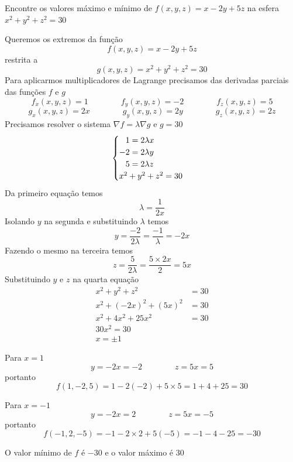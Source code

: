 \documentclass[a4paper,12pt,fleqn]{article}
\begin{document}
Encontre os valores máximo e mínimo de \(f(x, y, z) = x - 2y + 5z\)
na esfera \(x^2+y^2+z^2=30\)

\begin{answer}
  Queremos os extremos da função
  \[
    f(x, y, z) = x - 2y + 5z
  \]
  restrita a
  \[
    g(x, y, z) = x^2 + y^2 + z^2 = 30
  \]
  Para aplicarmos multiplicadores de Lagrange precisamos das derivadas parciais
  das funções $f$ e $g$
  \[
    f_x(x, y, z) =  1 \qquad\qquad
    f_y(x, y, z) = -2 \qquad\qquad
    f_z(x, y, z) =  5
  \]
  \[
    g_x(x, y, z) = 2x \qquad\qquad
    g_y(x, y, z) = 2y \qquad\qquad
    g_z(x, y, z) = 2z
  \]
  Precisamos resolver o sistema \(\nabla f = \lambda \nabla g\) e \(g=30\)
  \[
  \begin{cases}
    \hphantom{-}1 = 2\lambda x \\
    -2 = 2\lambda y \\
    \hphantom{-}5 = 2\lambda z \\
    x^2 + y^2 + z^2 = 30
  \end{cases}
  \]
  Da primeiro equação temos
  \[
    \lambda = \frac{1}{2x}
  \]
  Isolando $y$ na segunda e substituindo $\lambda$ temos
  \[
    y
    = \frac{-2}{2\lambda}
    = \frac{-1}{\lambda}
    = -2x
  \]
  Fazendo o mesmo na terceira temos
  \[
    z
    = \frac{5}{2\lambda}
    = \frac{5\times 2x}{2}
    = 5x
  \]
  Substituindo $y$ e $z$ na quarta equação
  \begin{align*}
    x^2 + y^2 + z^2        & = 30 \\
    x^2 + (-2x)^2 + (5x)^2 & = 30 \\
    x^2 + 4x^2 + 25x^2     & = 30 \\
    30 x^2 = 30            &  \\
    x = \pm 1              &
  \end{align*}

  Para $x=1$
  \[
    y = -2x = -2 \qquad\qquad
    z = 5x = 5
  \]
  portanto
  \[
    f(1, -2, 5)
    = 1 - 2(-2) + 5\times 5
    = 1 + 4 + 25
    = 30
  \]

  Para $x=-1$
  \[
    y = -2x = 2 \qquad\qquad
    z = 5x = -5
  \]
  portanto
  \[
    f(-1, 2, -5)
    = -1 - 2\times 2 + 5(-5)
    = -1 - 4 - 25
    = -30
  \]

  O valor mínimo de $f$ é $-30$ e o valor máximo é $30$
\end{answer}

\end{document}
